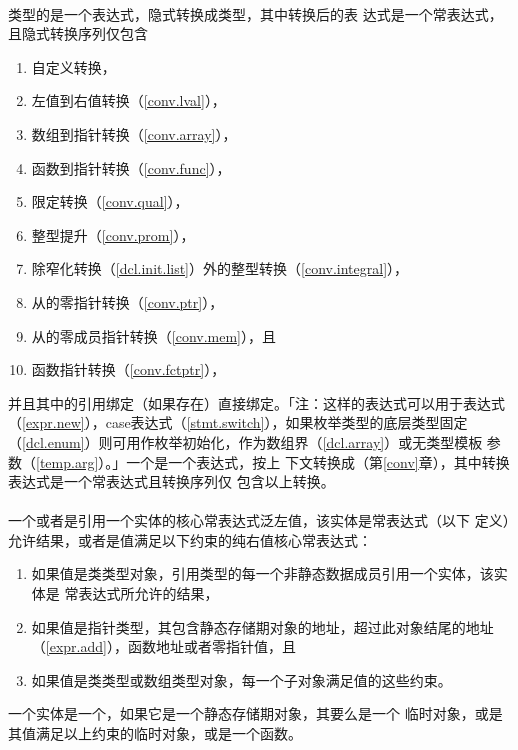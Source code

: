 \paragraph{}
类型的是一个表达式，隐式转换成类型，其中转换后的表
达式是一个常表达式，且隐式转换序列仅包含
\begin{enumerate}
  \item{自定义转换，}
  \item{左值到右值转换（\ref{conv.lval}），}
  \item{数组到指针转换（\ref{conv.array}），}
  \item{函数到指针转换（\ref{conv.func}），}
  \item{限定转换（\ref{conv.qual}），}
  \item{整型提升（\ref{conv.prom}），}
  \item{除窄化转换（\ref{dcl.init.list}）外的整型转换（\ref{conv.integral}），}
  \item{从的零指针转换（\ref{conv.ptr}），}
  \item{从的零成员指针转换（\ref{conv.mem}），且}
  \item{函数指针转换（\ref{conv.fctptr}），}
\end{enumerate}
并且其中的引用绑定（如果存在）直接绑定。「注：这样的表达式可以用于表达式
（\ref{expr.new}），case表达式（\ref{stmt.switch}），如果枚举类型的底层类型固定
（\ref{dcl.enum}）则可用作枚举初始化，作为数组界（\ref{dcl.array}）或无类型模板
参数（\ref{temp.arg}）。」一个是一个表达式，按上
下文转换成（第\ref{conv}章），其中转换表达式是一个常表达式且转换序列仅
包含以上转换。

\paragraph{}
一个或者是引用一个实体的核心常表达式泛左值，该实体是常表达式（以下
定义）允许结果，或者是值满足以下约束的纯右值核心常表达式：
\begin{enumerate}
  \item{如果值是类类型对象，引用类型的每一个非静态数据成员引用一个实体，该实体是
    常表达式所允许的结果，}
  \item{如果值是指针类型，其包含静态存储期对象的地址，超过此对象结尾的地址
    （\ref{expr.add}），函数地址或者零指针值，且}
  \item{如果值是类类型或数组类型对象，每一个子对象满足值的这些约束。}
\end{enumerate}
一个实体是一个，如果它是一个静态存储期对象，其要么是一个
临时对象，或是其值满足以上约束的临时对象，或是一个函数。

